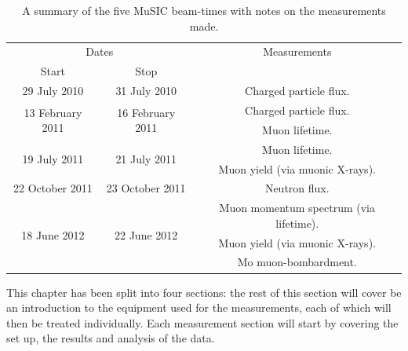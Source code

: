 \begin{table}[htpb]
  \begin{center}
    \begin{tabular}{c|c|c}
      \multicolumn{2}{c|}{Dates}          & Measurements                                \\
      Start            & Stop             &                                             \\
      \hline                                                                             
      29 July 2010     & 31 July 2010     & Charged particle flux.                      \\
      \hline
      \multirow{2}{*}{13 February 2011}
                       & \multirow{2}{*}{16 February 2011}
                                           & Charged particle flux.                     \\
                       &                   & Muon lifetime.                             \\
      \hline
      \multirow{2}{*}{19 July 2011}
                       & \multirow{2}{*}{21 July 2011}
                                          & Muon lifetime.                              \\
                       &                  & Muon yield (via muonic X-rays).             \\
      \hline
      22 October 2011  & 23 October 2011  & Neutron flux.                               \\
      \hline
      \multirow{3}{*}{18 June 2012}
                       & \multirow{3}{*}{22 June 2012}    
                                          & Muon momentum spectrum (via lifetime).      \\
                       &                  & Muon yield (via muonic X-rays).             \\
                       &                  & Mo muon-bombardment.                        \\
    \end{tabular}
  \end{center}
  \caption{A summary of the five MuSIC beam-times with notes on the measurements made.}
  \label{tab:summary_music_beam_time}
\end{table}

This chapter has been split into four sections: the rest of this section will cover be an introduction to the equipment used for the measurements, each of which will then be treated individually. Each measurement section will start by covering the set up, the results and analysis of the data.

